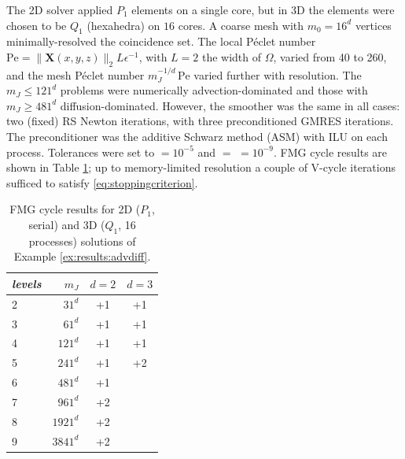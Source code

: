 \documentclass[review,hidelinks,onefignum,onetabnum,final]{siamart220329}  %
\newcommand{\eps}{\epsilon}
\newcommand{\bX}{\mathbf{X}}
\begin{document}
\begin{example}
The 2D solver applied $P_1$ elements on a single core, but in 3D the elements were chosen to be $Q_1$ (hexahedra) on $16$ cores.  A coarse mesh with $m_0=16^d$ vertices minimally-resolved the coincidence set.  The local Péclet number $\text{Pe}=\|\bX(x,y,z)\|_2 L \eps^{-1}$, with $L=2$ the width of $\Omega$, varied from 40 to 260, and the mesh Péclet number $m_J^{-1/d}\,\text{Pe}$ varied further with resolution.  The $m_J\le 121^d$ problems were numerically advection-dominated and those with $m_J\ge 481^d$ diffusion-dominated.  However, the smoother was the same in all cases: two (fixed) RS Newton iterations, with three preconditioned GMRES iterations.  The preconditioner was the additive Schwarz method (ASM) with ILU on each process.  Tolerances were set to  $=10^{-5}$ and  $=$  $= 10^{-9}$.  FMG cycle results are shown in Table \ref{tab:results:advdiff}; up to memory-limited resolution a couple of V-cycle iterations sufficed to satisfy \eqref{eq:stoppingcriterion}.
\end{example}

\begin{table}[ht]
\centering
\begin{tabular}{lr@{\hskip 7mm}c@{\hskip 4mm}c}
\toprule
\emph{levels} & $m_J$ & $d=2$ & $d=3$ \\
\midrule
 2 &    $31^d$ & +1 & +1 \\
 3 &    $61^d$ & +1 & +1 \\
 4 &   $121^d$ & +1 & +1 \\
 5 &   $241^d$ & +1 & +2 \\
 6 &   $481^d$ & +1 \\
 7 &   $961^d$ & +2 \\
 8 &  $1921^d$ & +2 \\
 9 &  $3841^d$ & +2 \\
\bottomrule
\end{tabular}
\bigskip
\caption{FMG cycle results for 2D ($P_1$, serial) and 3D ($Q_1$, 16 processes) solutions of Example \ref{ex:results:advdiff}.}
\label{tab:results:advdiff}
\end{table}
\end{document}
